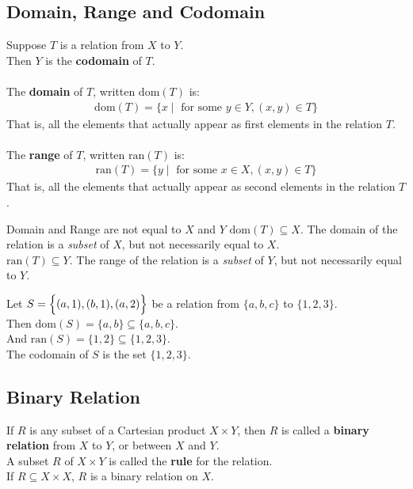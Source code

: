\documentclass[../notes.tex]{subfiles}
\begin{document}
			\subsection{Domain, Range and Codomain}
				Suppose $T$ is a relation from $X$ to $Y$.\\
				Then $Y$ is the \textbf{codomain} of $T$.\\
				\vspace{2mm}\\
				The \textbf{domain} of $T$, written $\mathrm{dom}(T)$ is:
					\begin{align*}
						\mathrm{dom}(T) = \{x \mid \text{ for some } y \in Y, (x, y) \in T\}
					\end{align*}
				That is, all the elements that actually appear as first elements in the relation $T$.\\
				\vspace{2mm}\\
				The \textbf{range} of $T$, written $\mathrm{ran}(T)$ is:
				\begin{align*}
					\mathrm{ran}(T) = \{y \mid \text{ for some } x \in X, (x, y) \in T\}
				\end{align*}
			That is, all the elements that actually appear as second elements in the relation $T$.
			\begin{notebox}{Domain and Range are not equal to $X$ and $Y$}
				$\mathrm{dom}(T) \subseteq X$. The domain of the relation is a \textit{subset} of $X$, but not necessarily equal to $X$.\\
				$\mathrm{ran}(T) \subseteq Y$. The range of the relation is a \textit{subset} of $Y$, but not necessarily equal to $Y$.
			\end{notebox}
			\begin{examplebox}
				Let $S = \Bigl\{(a, 1), (b, 1), (a, 2)\Bigr\}$ be a relation from $\{a, b, c\}$ to $\{1, 2, 3\}$.\\
				Then $\mathrm{dom}(S) = \{a, b\} \subseteq \{a, b, c\}$.\\
				And $\mathrm{ran}(S) = \{1, 2\} \subseteq \{1, 2, 3\}$.\\
				The codomain of $S$ is the set $\{1, 2, 3\}$. 
			\end{examplebox}
			\subsection{Binary Relation}
				If $R$ is any subset of a Cartesian product $X \times Y$, then $R$ is called a \textbf{binary relation} from $X$ to $Y$, or between $X$ and $Y$.\\
				A subset $R$ of $X \times Y$ is called the \textbf{rule} for the relation.\\
				If $R \subseteq X \times X$, $R$ is a binary relation on $X$.
			\pagebreak
\end{document}
